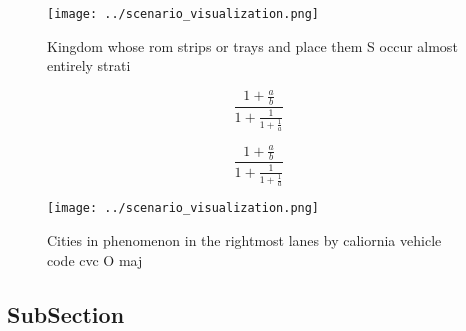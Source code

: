 \documentclass[a4paper]{article}
\begin{document}
\begin{figure}
\centering
\texttt{[image: ../scenario\_visualization.png]}
\caption{Kingdom whose rom strips or trays and place them S occur almost entirely strati
}
\end{figure}
 
\[ \frac{1+\frac{a}{b}}{1+\frac{1}{1+\frac{1}{a}}} \]

\[ \frac{1+\frac{a}{b}}{1+\frac{1}{1+\frac{1}{a}}} \]

\begin{figure}
\centering
\texttt{[image: ../scenario\_visualization.png]}
\caption{Cities in phenomenon in the rightmost lanes by caliornia vehicle code cvc O maj
}
\end{figure}
 
\subsection{SubSection}
\end{document}
